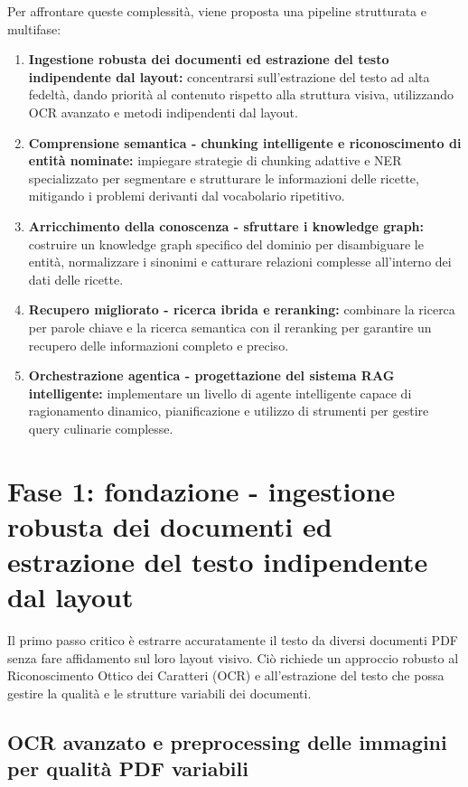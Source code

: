 \documentclass[a4paper, 11pt]{article}
\begin{document}
Per affrontare queste complessità, viene proposta una pipeline strutturata e multifase:
\begin{enumerate}
   \item \textbf{Ingestione robusta dei documenti ed estrazione del testo indipendente dal layout:} concentrarsi sull'estrazione del testo ad alta fedeltà, dando priorità al contenuto rispetto alla struttura visiva, utilizzando OCR avanzato e metodi indipendenti dal layout.
   \item \textbf{Comprensione semantica - chunking intelligente e riconoscimento di entità nominate:} impiegare strategie di chunking adattive e NER specializzato per segmentare e strutturare le informazioni delle ricette, mitigando i problemi derivanti dal vocabolario ripetitivo.
   \item \textbf{Arricchimento della conoscenza - sfruttare i knowledge graph:} costruire un knowledge graph specifico del dominio per disambiguare le entità, normalizzare i sinonimi e catturare relazioni complesse all'interno dei dati delle ricette.
   \item \textbf{Recupero migliorato - ricerca ibrida e reranking:} combinare la ricerca per parole chiave e la ricerca semantica con il reranking per garantire un recupero delle informazioni completo e preciso.
   \item \textbf{Orchestrazione agentica - progettazione del sistema RAG intelligente:} implementare un livello di agente intelligente capace di ragionamento dinamico, pianificazione e utilizzo di strumenti per gestire query culinarie complesse.
\end{enumerate}

\section{Fase 1: fondazione - ingestione robusta dei documenti ed estrazione del testo indipendente dal layout}

Il primo passo critico è estrarre accuratamente il testo da diversi documenti PDF senza fare affidamento sul loro layout visivo. Ciò richiede un approccio robusto al Riconoscimento Ottico dei Caratteri (OCR) e all'estrazione del testo che possa gestire la qualità e le strutture variabili dei documenti.

\subsection{OCR avanzato e preprocessing delle immagini per qualità PDF variabili}
\end{document}
